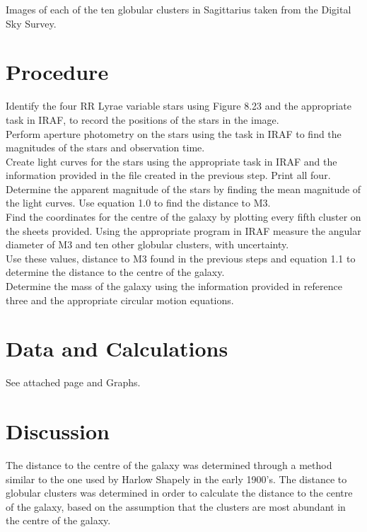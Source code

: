 \documentclass{article}
\begin{document}
Images of each of the ten globular clusters in Sagittarius taken from the Digital Sky Survey.

\section{Procedure}
Identify the four RR Lyrae variable stars using Figure 8.23 and the appropriate task in IRAF, to record the positions of the stars in the image.\\

Perform aperture photometry on the stars using the task in IRAF to find the magnitudes of the stars and observation time.\\

Create light curves for the stars using the appropriate task in IRAF and the information provided in the file created in the previous step. Print all four.\\

Determine the apparent magnitude of the stars by finding the mean magnitude of the light curves. Use equation 1.0 to find the distance to M3.\\

Find the coordinates for the centre of the galaxy by plotting every fifth cluster on the sheets provided.
Using the appropriate program in IRAF measure the angular diameter of M3 and ten other globular clusters, with uncertainty.\\

Use these values, distance to M3 found in the previous steps and equation 1.1 to determine the distance to the centre of the galaxy.\\

Determine the mass of the galaxy using the information provided in reference three and the appropriate circular motion equations.
\section{Data and Calculations}
See attached page and Graphs.
\section{Discussion}
The distance to the centre of the galaxy was determined through a method similar to the one used by Harlow Shapely in the early 1900’s. The distance to globular clusters was determined in order to calculate the distance to the centre of the galaxy, based on the assumption that the clusters are most abundant in the centre of the galaxy.\\
\end{document}
